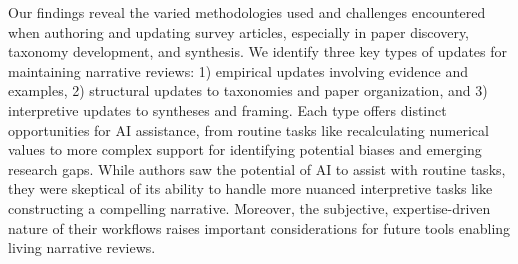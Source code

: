 Our findings reveal the varied methodologies used and challenges encountered when authoring and updating survey articles, especially in paper discovery, taxonomy development, and synthesis. We identify three key types of updates for maintaining narrative reviews: 1) empirical updates involving evidence and examples, 2) structural updates to taxonomies and paper organization, and 3) interpretive updates to syntheses and framing. Each type offers distinct opportunities for AI assistance, from routine tasks like recalculating numerical values to more complex support for identifying potential biases and emerging research gaps. While authors saw the potential of AI to assist with routine tasks, they were skeptical of its ability to handle more nuanced interpretive tasks like constructing a compelling narrative. Moreover, the subjective, expertise-driven nature of their workflows raises important considerations for future tools enabling living narrative reviews.